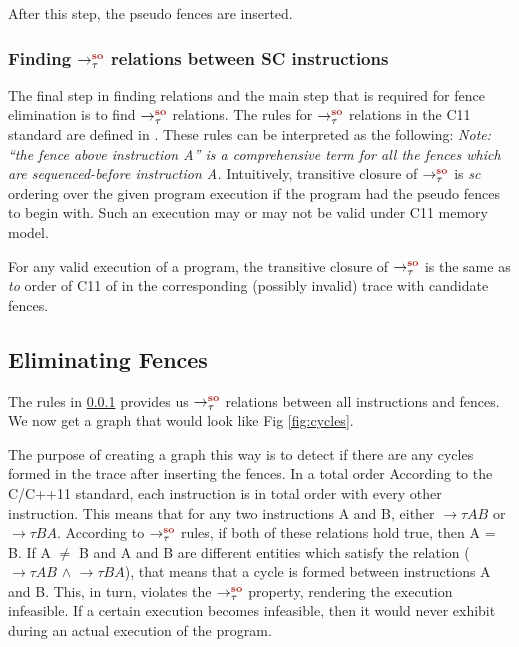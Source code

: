 \par
After this step, the pseudo fences are inserted.

\subsubsection{Finding $\setSO$ relations between SC instructions}\label{to_rel}
The final step in finding relations and the main step that is required for 
fence elimination is to find $\setSO$ relations. The rules for $\setSO$ relations 
in the C11 standard are defined in \cite{C11}. These rules can be interpreted 
as the following:
%
\textit{Note: ``the fence above instruction A'' is a comprehensive term for all 
	the fences which are sequenced-before instruction A.}
Intuitively, transitive closure of $\setSO$ is \emph{sc} ordering over the 
given program execution if the program had the pseudo fences to begin with.
Such an execution may or may not be valid under C11 memory model.

\begin{theorem}
	For any valid execution of a program, the transitive closure of $\setSO$ 
	is the same as \emph{to} order of C11 of in the corresponding (possibly 
	invalid) trace with candidate fences.
\end{theorem}


\subsection{Eliminating Fences}
The rules in \textsection\ref{to_rel} provides us $\setSO$ relations between all 
instructions and fences. We now get a graph that would look 
like Fig \ref{fig:cycles}. 


\par
The purpose of creating a graph this way is to detect if there are any cycles 
formed in the trace after inserting the fences. 
In a total order 
According to the C/C++11 standard, each \mosc instruction is in total order 
with every other \mosc instruction. This means that for any two \mosc 
instructions A and B, either $\to{\tau}{A}{B}$ or $\to{\tau}{B}{A}$. According to 
$\setSO$ rules, if both of these relations hold true, then A = B. 
If A $\neq$ B and A and B are different entities which satisfy the 
relation ($\to{\tau}{A}{B}$ $\land$ $\to{\tau}{B}{A}$), that means that a cycle is 
formed between instructions A and B. This, in turn, violates the $\setSO$ 
property, rendering the execution infeasible. If a certain execution 
becomes infeasible, then it would never exhibit during an actual execution 
of the program.

